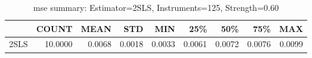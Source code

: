 \begin{table}[ht]
\centering
\caption{mse summary: Estimator=2SLS, Instruments=125, Strength=0.60}
\begin{tabular}{lrrrrrrrr}
\toprule
 & COUNT & MEAN & STD & MIN & 25\% & 50\% & 75\% & MAX \\
\midrule
2SLS & 10.0000 & 0.0068 & 0.0018 & 0.0033 & 0.0061 & 0.0072 & 0.0076 & 0.0099 \\
\bottomrule
\end{tabular}
\end{table}
